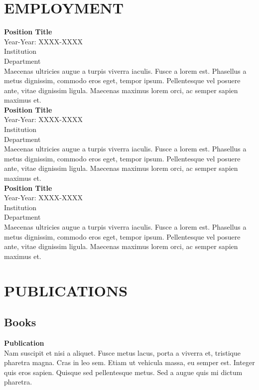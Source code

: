 \documentclass[a4paper,9pt]{extarticle}
\begin{document}

\section*{EMPLOYMENT}
\noindent
\newline
\textbf{Position Title} \\
Year-Year: XXXX-XXXX \\
Institution \\ 
Department \\
Maecenas ultricies augue a turpis viverra iaculis. Fusce a lorem est. Phasellus a metus dignissim, commodo eros eget, tempor ipsum. Pellentesque vel posuere ante, vitae dignissim ligula. Maecenas maximus lorem orci, ac semper sapien maximus et. \\ 

\noindent
\textbf{Position Title} \\
Year-Year: XXXX-XXXX \\
Institution \\ 
Department \\
Maecenas ultricies augue a turpis viverra iaculis. Fusce a lorem est. Phasellus a metus dignissim, commodo eros eget, tempor ipsum. Pellentesque vel posuere ante, vitae dignissim ligula. Maecenas maximus lorem orci, ac semper sapien maximus et. \\

\noindent
\textbf{Position Title} \\
Year-Year: XXXX-XXXX \\
Institution \\ 
Department \\
Maecenas ultricies augue a turpis viverra iaculis. Fusce a lorem est. Phasellus a metus dignissim, commodo eros eget, tempor ipsum. Pellentesque vel posuere ante, vitae dignissim ligula. Maecenas maximus lorem orci, ac semper sapien maximus et. 


\section*{PUBLICATIONS}
 
\subsection*{Books}
\textbf{Publication} \\ 
Nam suscipit et nisi a aliquet. Fusce metus lacus, porta a viverra et, tristique pharetra magna. Cras in leo sem. Etiam ut vehicula massa, eu semper est. Integer quis eros sapien. Quisque sed pellentesque metus. Sed a augue quis mi dictum pharetra. 
\end{document}
